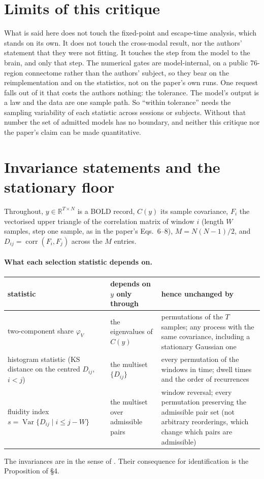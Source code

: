 \documentclass[11pt]{article}
\theoremstyle{definition}\newtheorem{observation}{Observation}
\theoremstyle{remark}\newtheorem{remark}{Remark}
\begin{document}
\section{Limits of this critique}
What is said here does not touch the fixed-point and escape-time analysis, which stands on its own. It does not touch the cross-modal result, nor the authors' statement that they were not fitting. It touches the step from the model to the brain, and only that step. The numerical gates are model-internal, on a public 76-region connectome rather than the authors' subject, so they bear on the reimplementation and on the statistics, not on the paper's own runs. One request falls out of it that costs the authors nothing: the tolerance. The model's output is a law and the data are one sample path. So ``within tolerance'' needs the sampling variability of each statistic across sessions or subjects. Without that number the set of admitted models has no boundary, and neither this critique nor the paper's claim can be made quantitative.


\appendix
\section{Invariance statements and the stationary floor}
Throughout, $y\in\mathbb{R}^{T\times N}$ is a BOLD record, $C(y)$ its sample covariance, $F_i$ the vectorised upper triangle of the correlation matrix of window $i$ (length $W$ samples, step one sample, as in the paper's Eqs.~6--8), $M=N(N-1)/2$, and $D_{ij}=\operatorname{corr}(F_i,F_j)$ across the $M$ entries.

\paragraph{What each selection statistic depends on.}
\begin{center}\small
\begin{tabular}{p{4.0cm}p{4.0cm}p{6.0cm}}
\toprule
statistic & depends on $y$ only through & hence unchanged by \\
\midrule
two-component share $\varphi_V$ & the eigenvalues of $C(y)$ & permutations of the $T$ samples; any process with the same covariance, including a stationary Gaussian one \\
histogram statistic (KS distance on the centred $D_{ij}$, $i<j$) & the multiset $\{D_{ij}\}$ & every permutation of the windows in time; dwell times and the order of recurrences \\
fluidity index $s=\operatorname{Var}\{D_{ij}\mid i\le j-W\}$ & the multiset over admissible pairs & window reversal; every permutation preserving the admissible pair set (not arbitrary reorderings, which change which pairs are admissible) \\
\bottomrule
\end{tabular}
\end{center}
The invariances are in the sense of \textcite[ch.~6]{lehmann2005}. Their consequence for identification is the Proposition of \S4.
\end{document}
